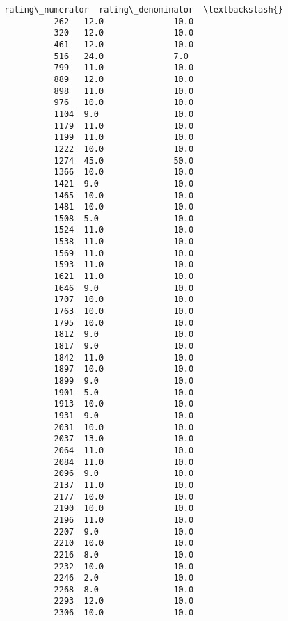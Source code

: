 \documentclass[11pt]{article}
\begin{document}
\begin{Verbatim}[commandchars=\\\{\}]
                rating\_numerator  rating\_denominator  \textbackslash{}
          262   12.0              10.0                 
          320   12.0              10.0                 
          461   12.0              10.0                 
          516   24.0              7.0                  
          799   11.0              10.0                 
          889   12.0              10.0                 
          898   11.0              10.0                 
          976   10.0              10.0                 
          1104  9.0               10.0                 
          1179  11.0              10.0                 
          1199  11.0              10.0                 
          1222  10.0              10.0                 
          1274  45.0              50.0                 
          1366  10.0              10.0                 
          1421  9.0               10.0                 
          1465  10.0              10.0                 
          1481  10.0              10.0                 
          1508  5.0               10.0                 
          1524  11.0              10.0                 
          1538  11.0              10.0                 
          1569  11.0              10.0                 
          1593  11.0              10.0                 
          1621  11.0              10.0                 
          1646  9.0               10.0                 
          1707  10.0              10.0                 
          1763  10.0              10.0                 
          1795  10.0              10.0                 
          1812  9.0               10.0                 
          1817  9.0               10.0                 
          1842  11.0              10.0                 
          1897  10.0              10.0                 
          1899  9.0               10.0                 
          1901  5.0               10.0                 
          1913  10.0              10.0                 
          1931  9.0               10.0                 
          2031  10.0              10.0                 
          2037  13.0              10.0                 
          2064  11.0              10.0                 
          2084  11.0              10.0                 
          2096  9.0               10.0                 
          2137  11.0              10.0                 
          2177  10.0              10.0                 
          2190  10.0              10.0                 
          2196  11.0              10.0                 
          2207  9.0               10.0                 
          2210  10.0              10.0                 
          2216  8.0               10.0                 
          2232  10.0              10.0                 
          2246  2.0               10.0                 
          2268  8.0               10.0                 
          2293  12.0              10.0                 
          2306  10.0              10.0                 
          

\end{Verbatim}
\end{document}
